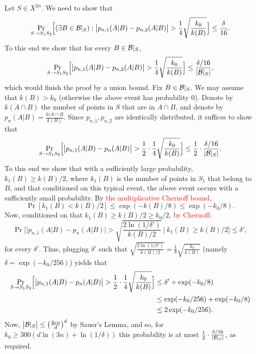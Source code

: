 \documentclass{article}
\newcommand{\B}{{\cal B}}
\newcommand{\new}[1]{\textcolor{red}{#1}}
\newcommand{\comment}[3]{\marginpar{\textcolor{#2}{#1: #3}}}
\newcommand{\shay}[1]{\comment{Shay}{red}{#1}}
\begin{document}
Let $S\in X^{2n}$. 
We need to show that
\[\Pr_{S\to S_1S_2}\Bigl[(\exists B\in \B|_S) : \bigl\lvert p_{n,1}(A \vert B) - p_{n,2}(A \vert B)  \bigr\rvert > \frac{1}{4}\sqrt{\frac{k_0}{k(B)}} \Bigr] \leq \frac{\delta}{16}.\]
To this end we show that
for every $B\in \B|_S$, 
\[\Pr_{S\to S_1S_2}\Bigl[\bigl\lvert p_{n,1}(A \vert B) - p_{n,2}(A \vert B)  \bigr\rvert > \frac{1}{4}\sqrt{\frac{k_0}{k(B)}} \Bigr] \leq \frac{\delta/16}{\lvert \B|_S\rvert},\]
which would finish the proof by a union bound.
Fix $B\in \B|_S$. 
We may assume that $k(B)> k_0$ (otherwise the above event has probability $0$). 
Denote by $k(A\cap B)$ the number of points in $S$
that are in $A\cap B$, and denote by $p_n(A\vert B) = \frac{k(A\cap B}{k(B)}$.
Since $p_{n,1},p_{n,2}$ are identically distributed, it suffices to show that
\[\Pr_{S\to S_1S_2}\Bigl[\bigl\lvert p_{n,1}(A \vert B) - p_{n}(A \vert B)  \bigr\rvert > \frac{1}{2}\cdot\frac{1}{4}\sqrt{\frac{k_0}{k(B)}} \Bigr] \leq \frac{1}{2}\cdot\frac{\delta/16}{\lvert \B|_S\rvert}.\]
To this end we show that with a sufficiently large probability, 
$k_1(B)\geq k(B)/2$, where $k_1(B)$ is the number of points in $S_1$ that belong to $B$,
and that conditioned on this typical event, the above event occurs with a sufficiently small probability.
By \new{the multiplicative Chernoff bound},
\shay{Here we should refer to the statement that sampling without repetitions is more concentrated.}
\[ \Pr[k_1(B) < k(B)/2] \leq \exp(-k(B)/8) \leq \exp(-k_0/8).\]
Now, conditioned on that $k_1(B) \geq k(B)/2\geq k_0/2$, \new{by Chernoff}:
\[\Pr\Biggl[ \bigl\lvert p_{n,1}(A \vert B) - p_n(A \vert B) \bigr\rvert >\sqrt{\frac{2\ln(1/\delta')}{k(B)/2}}~ \Biggr\vert~ k_1(B) \geq k(B)/2\Biggr] \leq \delta',
\]
for every $\delta'$. 
Thus, plugging $\delta'$ such that $\sqrt{\frac{2\ln(1/\delta')}{k(B)/2}} = \frac{1}{8}\sqrt{\frac{k_0}{k(B)}}$
(namely $\delta = \exp(-k_0/256)$) yields that
\begin{align*}
\Pr_{S\to S_1S_2}\Bigl[\bigl\lvert p_{n,1}(A \vert B) - p_{n}(A \vert B)  \bigr\rvert > \frac{1}{2}\cdot\frac{1}{4}\sqrt{\frac{k_0}{k(B)}} \Bigr] 
&\leq  \delta' + \exp(-k_0/8)\\
&\leq  \exp(-k_0/256) + \exp(-k_0/8)\\
&\leq 2\exp(-k_0/256).
\end{align*}
Now, $\bigl\lvert \B|_S\bigr\rvert \leq \bigl(\frac{2en}{d}\bigr)^d$ by Sauer's Lemma,  and so, for $k_0\geq 300(d\ln(3n) + \ln(1/\delta))$ this probability is at most $\frac{1}{2}\cdot\frac{\delta/16}{\lvert \B|_S\rvert}$, as required.
\end{document}
